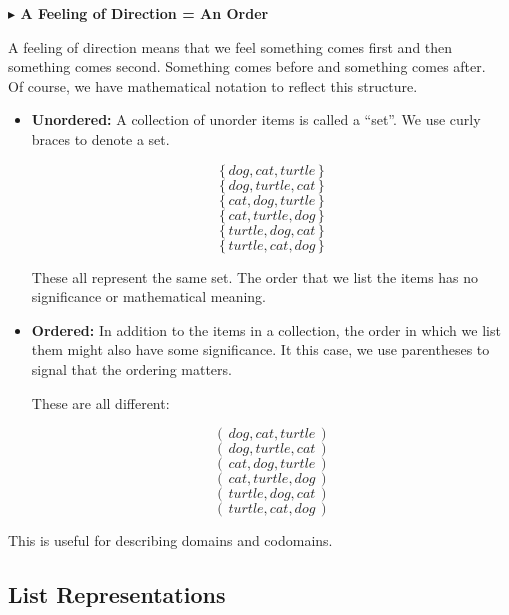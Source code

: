 \documentclass{ximera}
\begin{document}
\textbf{\textcolor{red!70!black}{$\blacktriangleright$ A Feeling of Direction = An Order}}

A feeling of direction means that we feel something comes first and then something comes second.  Something comes before and something comes after. \\


Of course, we have mathematical notation to reflect this structure. \\


\begin{itemize}
\item \textbf{\textcolor{blue!55!black}{Unordered:}}  A collection of unorder items is called a ``set''.  We use curly braces to denote a set.

\[
\{ \, dog, cat, turtle \, \}
\]
\[
\{ \, dog, turtle, cat \, \}
\]
\[
\{ \, cat, dog, turtle \, \}
\]
\[
\{ \, cat, turtle, dog \, \}
\]
\[
\{ \, turtle, dog, cat \, \}
\]
\[
\{ \, turtle, cat, dog \, \}
\]

These all represent the same set.  The order that we list the items has no significance or mathematical meaning.


\item \textbf{\textcolor{blue!55!black}{Ordered:}} In addition to the items in a collection, the order in which we list them might also have some significance.  It this case, we use parentheses to signal that the ordering matters.


These are all different:

\[
( \, dog, cat, turtle \, )
\]
\[
( \, dog, turtle, cat \, )
\]
\[
( \, cat, dog, turtle \, )
\]
\[
( \, cat, turtle, dog \, )
\]
\[
( \, turtle, dog, cat \, )
\]
\[
( \, turtle, cat, dog \, )
\]


\end{itemize}


This is useful for describing domains and codomains.  \\

























\subsection*{List Representations}
\end{document}
